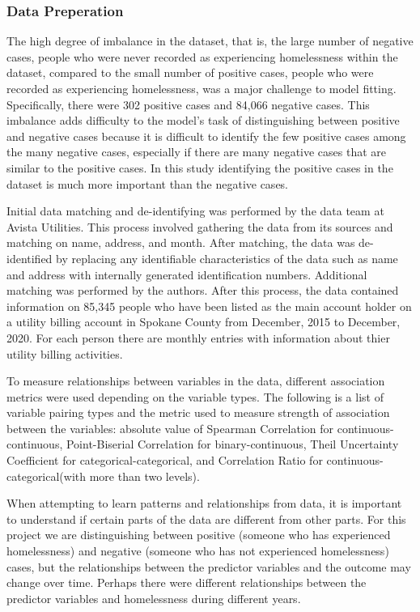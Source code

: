 \documentclass[10pt,letterpaper]{article}
\newcommand{\red}[1]{{\color{red}{#1}}}
\begin{document}
\subsubsection*{Data Preperation}
The high degree of imbalance in the dataset, that is, the large number of negative cases, people who were never recorded as experiencing homelessness within the dataset, compared to the small number of positive cases, people who were recorded as experiencing homelessness, was a major challenge to model fitting. Specifically, there were 302 positive cases and 84,066 negative cases. This imbalance adds difficulty to the model's task of distinguishing between positive and negative cases because it is difficult to identify the few positive cases among the many negative cases, especially if there are many negative cases that are similar to the positive cases. In this study identifying the positive cases in the dataset is much more important than the negative cases.

Initial data matching and de-identifying was performed by the data team at Avista Utilities. This process involved gathering the data from its sources and matching on name, address, and month. After matching, the data was de-identified by replacing any identifiable characteristics of the data such as name and address with internally generated identification numbers. Additional matching was performed by the authors. After this process, the data contained information on 85,345 people who have been listed as the main account holder on a utility billing account in Spokane County from December, 2015 to December, 2020. For each person there are monthly entries with information about thier utility billing activities. 

To measure relationships between variables in the data, different association metrics were used depending on the variable types. The following is a list of variable pairing types and the metric used to measure strength of association between the variables: absolute value of Spearman Correlation for continuous-continuous, Point-Biserial Correlation for binary-continuous, Theil Uncertainty Coefficient for categorical-categorical, and Correlation Ratio for continuous-categorical(with more than two levels). \red{REMOVE PREVIOUS PAGARAPH?}

\red{MOVE BELOW PART TO DISCUSSION?}
When attempting to learn patterns and relationships from data, it is important to understand if certain parts of the data are different from other parts. For this project we are distinguishing between positive (someone who has experienced homelessness) and negative (someone who has not experienced homelessness) cases, but the relationships between the predictor variables and the outcome may change over time. Perhaps there were different relationships between the predictor variables and homelessness during different years. 
\end{document}
